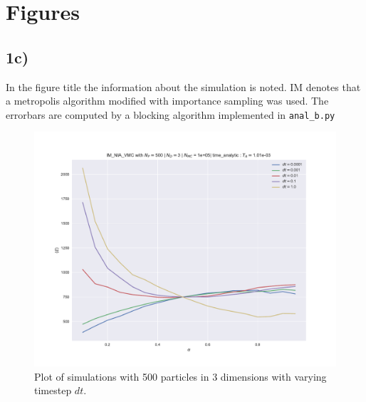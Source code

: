 \section{Figures}
\subsection{1c)}\label{app:fig-c}

In the figure title the information about the simulation is noted. IM denotes that a metropolis algorithm modified with importance sampling was used. 
The errorbars are computed by a blocking algorithm implemented in \lstinline{anal_b.py}

\begin{figure}
\hspace{-2.8cm}
\includegraphics[width = \paperwidth]{figures/c_figs/IM_NIA_np_500_nd_3_dtcomparison.pdf}
\caption{Plot of simulations with 500 particles in 3 dimensions with varying timestep $dt$.}
\label{fig:1c_dt}
\end{figure}

